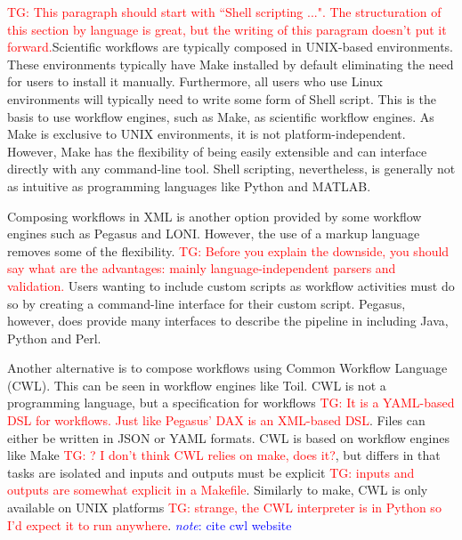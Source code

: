 \documentclass{report}
\newcommand{\note}[1]{\textcolor{blue}{\textit{note}: #1}}
\newcommand{\tristan}[1]{\textcolor{red}{TG: #1}}
\begin{document}
            \tristan{This paragraph should start with ``Shell scripting ...". The structuration of this section by language
            is great, but the writing of this paragram doesn't put it forward.}Scientific workflows are typically composed in UNIX-based 
            environments. These environments typically have Make installed by
            default eliminating the need for users to install it manually.
            Furthermore, all users who use Linux environments will typically 
            need to write some form of Shell script. This is the basis to use 
            workflow engines, such as Make, as scientific workflow engines. 
            As Make is exclusive to UNIX environments, it is not 
            platform-independent. However, Make has the flexibility of being
            easily extensible and can interface directly with any command-line
            tool. Shell scripting, nevertheless, is generally not as intuitive
            as programming languages like Python and MATLAB.

            Composing workflows in XML is another option provided by some 
            workflow engines such as Pegasus and LONI. However, the use of a 
            markup language removes some of the flexibility. \tristan{Before you explain the downside, 
            you should say what are the advantages: mainly language-independent parsers and validation.} Users wanting to 
            include 
            custom scripts as workflow activities must do so by creating a 
            command-line interface for their custom script. Pegasus, however,
            does provide many interfaces to describe the pipeline in including
            Java, Python and Perl.

            Another alternative is to compose workflows using Common Workflow
            Language (CWL). This can be seen in workflow engines like Toil. 
            CWL is not a programming language, but a specification for workflows
            \tristan{It is a YAML-based DSL for workflows. Just like Pegasus' DAX is an XML-based DSL}. Files can either be written in JSON or YAML formats. CWL is 
            based on workflow engines like Make \tristan{? I don't think CWL relies on make, does it?}, but differs in that tasks
            are isolated and inputs and outputs must be explicit \tristan{inputs and outputs are somewhat explicit in a Makefile}. Similarly to 
            make, CWL is only available on UNIX platforms \tristan{strange, the CWL interpreter is in Python so I'd expect it to run anywhere}. \note{cite cwl 
            website}
\end{document}
